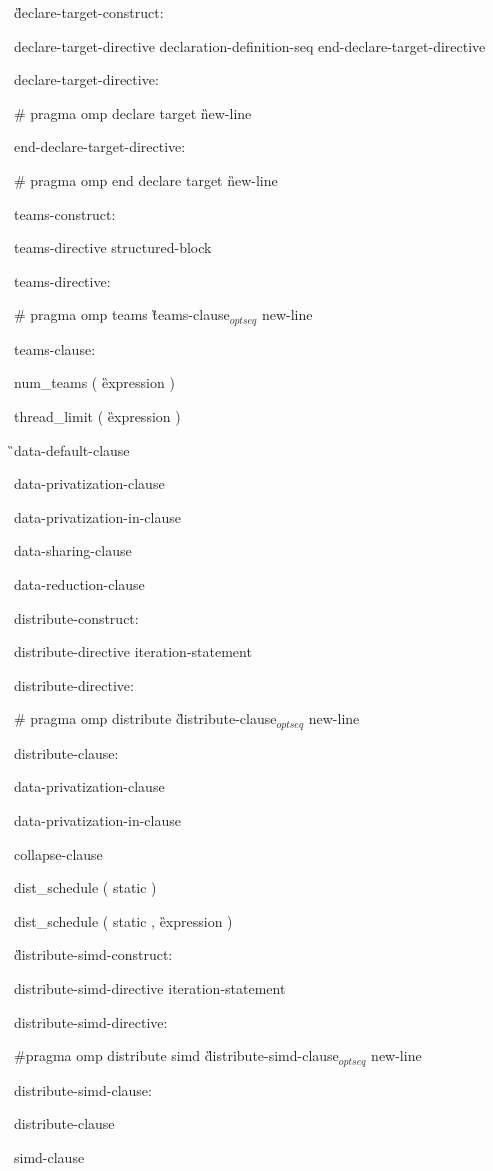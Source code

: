{\G declare-target-construct:

\I declare-target-directive declaration-definition-seq end-declare-target-directive

declare-target-directive:

\C\I \# pragma omp declare target \G new-line

end-declare-target-directive:

\C\I \# pragma omp end declare target \G new-line

teams-construct:

\I teams-directive structured-block

teams-directive:

\C\I \# pragma omp teams \G teams-clause$_{optseq}$ new-line

teams-clause:

\C\I num\_teams ( \G expression \C )

\C\I thread\_limit ( \G expression \C )

\G\I data-default-clause

\I data-privatization-clause

\I data-privatization-in-clause

\I data-sharing-clause

\I data-reduction-clause

distribute-construct:

\I distribute-directive iteration-statement

distribute-directive:

\C\I \# pragma omp distribute \G distribute-clause$_{optseq}$ new-line

distribute-clause:

\I data-privatization-clause

\I data-privatization-in-clause

\I collapse-clause

\I dist\_schedule ( static )

\I dist\_schedule ( static , \G expression \C )

\G distribute-simd-construct:

\I distribute-simd-directive iteration-statement

distribute-simd-directive:

\C\I \#pragma omp distribute simd \G distribute-simd-clause$_{optseq}$ new-line

distribute-simd-clause:

\I distribute-clause

\I simd-clause

}
